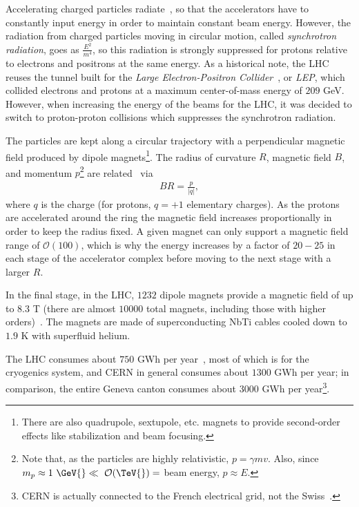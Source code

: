Accelerating charged particles radiate~\cite{jackson_1999}, so that the accelerators have to constantly input energy in order to maintain constant beam energy.
However, the radiation from charged particles moving in circular motion, called \textit{synchrotron radiation}, goes as $\frac{E^2}{m^{4}}$, so this radiation is strongly suppressed for protons relative to electrons and positrons at the same energy.
As a historical note, the LHC reuses the tunnel built for the \textit{Large Electron-Positron Collider}~\cite{LEP-design,Myers:226776,cern-lep}, or \textit{LEP}, which collided electrons and protons at a maximum center-of-mass energy of $209$ GeV.
However, when increasing the energy of the beams for the LHC, it was decided to switch to proton-proton collisions which suppresses the synchrotron radiation.

The particles are kept along a circular trajectory with a perpendicular magnetic field produced by dipole magnets\footnote{There are also quadrupole, sextupole, etc. magnets to provide second-order effects like stabilization and beam focusing.}.
The radius of curvature $R$, magnetic field $B$, and momentum $p$\footnote{Note that, as the particles are highly relativistic, $p=\gamma mv$. Also, since $m_p\approx 1~\GeV{} \ll ~\mathcal{O}(\TeV{})=$ beam energy, $p\approx E$.} are related~\cite{humphries_1986} via
\begin{align}
  BR = \frac{p}{|q|},
  \label{eqn:LHC:chargedparticle}
\end{align}
where $q$ is the charge (for protons, $q=+1$ elementary charges).
As the protons are accelerated around the ring the magnetic field increases proportionally in order to keep the radius fixed.
A given magnet can only support a magnetic field range of $\mathcal{O}(100)$, which is why the energy increases by a factor of $20-25$ in each stage of the accelerator complex before moving to the next stage with a larger $R$.

In the final stage, in the LHC, $1232$ dipole magnets provide a magnetic field of up to $8.3$ T (there are almost $10000$ total magnets, including those with higher orders)~\cite{CERN-Brochure-2017-002-Eng}.
The magnets are made of superconducting NbTi cables cooled down to $1.9$ K with superfluid helium.

The LHC consumes about $750$ GWh per year~\cite{cern-facts-and-figures}, most of which is for the cryogenics system, and CERN in general consumes about $1300$ GWh per year; in comparison, the entire Geneva canton consumes about $3000$ GWh per year\footnote{CERN is actually connected to the French electrical grid, not the Swiss~\cite{cern-powering}.}.

